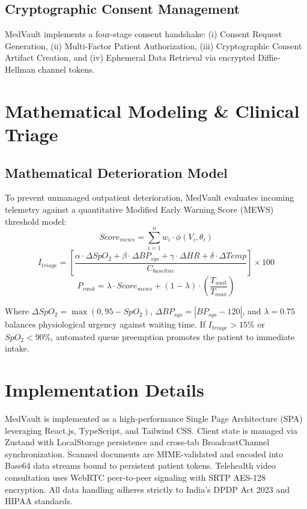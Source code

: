 \documentclass[conference]{IEEEtran}
\begin{document}
\subsection{Cryptographic Consent Management}
MedVault implements a four-stage consent handshake: (i) Consent Request Generation, (ii) Multi-Factor Patient Authorization, (iii) Cryptographic Consent Artifact Creation, and (iv) Ephemeral Data Retrieval via encrypted Diffie-Hellman channel tokens.

\section{Mathematical Modeling \& Clinical Triage}
\subsection{Mathematical Deterioration Model}
To prevent unmanaged outpatient deterioration, MedVault evaluates incoming telemetry against a quantitative Modified Early Warning Score (MEWS) threshold model:
\begin{equation}
Score_{mews} = \sum_{i=1}^n w_i \cdot \phi(V_i, \theta_i)
\end{equation}
\begin{equation}
I_{triage} = \left[ \frac{\alpha \cdot \Delta SpO_2 + \beta \cdot \Delta BP_{sys} + \gamma \cdot \Delta HR + \delta \cdot \Delta Temp}{C_{baseline}} \right] \times 100
\end{equation}
\begin{equation}
P_{rank} = \lambda \cdot Score_{mews} + (1 - \lambda) \cdot \left( \frac{T_{wait}}{T_{max}} \right)
\end{equation}

Where $\Delta SpO_2 = \max(0, 95 - SpO_2)$, $\Delta BP_{sys} = |BP_{sys} - 120|$, and $\lambda = 0.75$ balances physiological urgency against waiting time. If $I_{triage} > 15\%$ or $SpO_2 < 90\%$, automated queue preemption promotes the patient to immediate intake.

\section{Implementation Details}
MedVault is implemented as a high-performance Single Page Architecture (SPA) leveraging React.js, TypeScript, and Tailwind CSS. Client state is managed via Zustand with LocalStorage persistence and cross-tab BroadcastChannel synchronization. Scanned documents are MIME-validated and encoded into Base64 data streams bound to persistent patient tokens. Telehealth video consultation uses WebRTC peer-to-peer signaling with SRTP AES-128 encryption. All data handling adheres strictly to India's DPDP Act 2023 and HIPAA standards.
\end{document}

